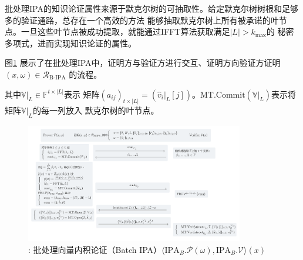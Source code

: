 \documentclass[zihao=-4]{ctexart}
\begin{document}
\begin{spacing}{1.5}
\begin{itemize}
\begin{equation}
        \end{equation}
        批处理IPA的知识论证属性来源于默克尔树的可抽取性。给定默克尔树树根和足够多的验证通路，总存在一个高效的方法
        能够抽取默克尔树上所有被承诺的叶节点。一旦这些叶节点被成功提取，就能通过IFFT算法获取满足$|L|>k_{\max}$的
        秘密多项式，进而实现知识论证的属性。
\end{itemize}\par
图\ref{B-IPA流程} 展示了在批处理IPA中，证明方与验证方进行交互、证明方向验证方证明$(x,\omega)\in\mathcal{R}_{\text{B-IPA}}$
的流程。\par
其中$\mathbb{V}|_L\in\mathbb{F}^{t\times|L|}$表示
矩阵$(a_{ij})_{t\times|L|}=(\hat{v}_i|_L[j])$。$\text{MT.Commit}(\mathbb{V}|_L)$表示将矩阵$\mathbb{V}|_L$的每一列放入
默克尔树的叶节点。
\begin{figure}[H]
  \centering
  \includegraphics[width=0.85\textwidth]{./include_picture/B-IPA.png}
  \caption{: 批处理向量内积论证（Batch IPA）$\langle \text{IPA}_B.\mathcal{P}(\omega),\text{IPA}_B.\mathcal{V}\rangle(x)$}
  \label{B-IPA流程}
\end{figure}


\end{spacing}
\end{document}

